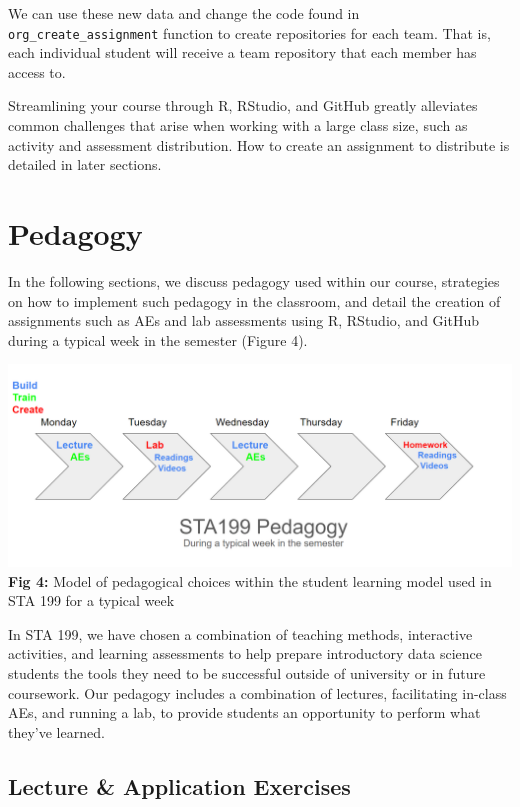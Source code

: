 \documentclass[
  12pt]{article}
\begin{document}
We can use these new data and change the code found in
\texttt{org\_create\_assignment} function to create repositories for
each team. That is, each individual student will receive a team
repository that each member has access to.

Streamlining your course through R, RStudio, and GitHub greatly
alleviates common challenges that arise when working with a large class
size, such as activity and assessment distribution. How to create an
assignment to distribute is detailed in later sections.

\hypertarget{sec-ped}{%
\section{Pedagogy}\label{sec-ped}}

In the following sections, we discuss pedagogy used within our course,
strategies on how to implement such pedagogy in the classroom, and
detail the creation of assignments such as AEs and lab assessments using
R, RStudio, and GitHub during a typical week in the semester (Figure 4).

\includegraphics{images/pedagogy.png} \textbf{Fig 4:} Model of
pedagogical choices within the student learning model used in STA 199
for a typical week

In STA 199, we have chosen a combination of teaching methods,
interactive activities, and learning assessments to help prepare
introductory data science students the tools they need to be successful
outside of university or in future coursework. Our pedagogy includes a
combination of lectures, facilitating in-class AEs, and running a lab,
to provide students an opportunity to perform what they've learned.

\hypertarget{lecture-application-exercises}{%
\subsection{Lecture \& Application
Exercises}\label{lecture-application-exercises}}
\end{document}
